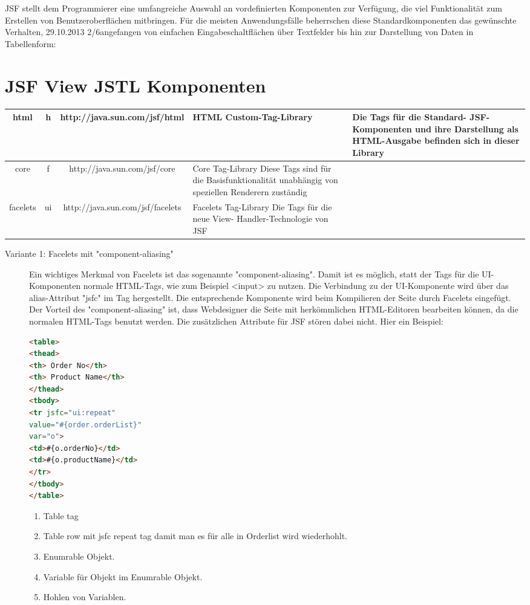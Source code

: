 \documentclass[a4paper,10pt]{scrreprt}
\begin{document}
{JSF stellt dem Programmierer eine umfangreiche Auswahl an vordefinierten Komponenten zur
Verfügung, die viel Funktionalität zum Erstellen von Benutzeroberflächen mitbringen. Für die
meisten Anwendungsfälle beherrschen diese Standardkomponenten das gewünschte Verhalten,
29.10.2013
2/6angefangen von einfachen Eingabeschaltflächen über Textfelder bis hin zur Darstellung von Daten
in Tabellenform:

\section{JSF View JSTL Komponenten}
\begin{tabular}{c | c | c | p{4cm}| p{4cm} | }
 html & h &  http://java.sun.com/jsf/html & HTML Custom-Tag-Library&Die Tags für die Standard- JSF-Komponenten und ihre
Darstellung als HTML-Ausgabe befinden sich in dieser Library \\ \hline
core & f & http://java.sun.com/jsf/core & Core Tag-Library Diese Tags sind für die Basisfunktionalität unabhängig 
von speziellen Renderern zuständig \\ \hline
facelets & ui & http://java.sun.com/jsf/facelets & Facelets Tag-Library
Die Tags für die neue View-
Handler-Technologie von JSF 
\\ \hline
\end{tabular}
\begin{description}
 \item [Variante 1: Facelets mit "component-aliasing"] Ein wichtiges Merkmal von Facelets ist das sogenannte 
"component-aliasing". Damit ist es möglich,
statt der Tags für die UI-Komponenten normale HTML-Tags, wie zum Beispiel <input> zu nutzen.
Die Verbindung zu der UI-Komponente wird über das alias-Attribut "jsfc" im Tag hergestellt. Die
entsprechende Komponente wird beim Kompilieren der Seite durch Facelets eingefügt. Der Vorteil
des "component-aliasing" ist, dass Webdesigner die Seite mit herkömmlichen HTML-Editoren
bearbeiten können, da die normalen HTML-Tags benutzt werden. Die zusätzlichen Attribute für JSF
stören dabei nicht. Hier ein Beispiel:
\begin{lstlisting}[caption=Component Aliasing,language=html]
 <table>
<thead>
<th> Order No</th>
<th> Product Name</th>
</thead>
<tbody>
<tr jsfc="ui:repeat"
value="#{order.orderList}"
var="o">
<td>#{o.orderNo}</td>
<td>#{o.productName}</td>
</tr>
</tbody>
</table>
\end{lstlisting}
\begin{enumerate}
 \item Table tag
 \item Table row mit jsfc repeat tag damit man es für alle in Orderlist wird wiederhohlt.
 \item Enumrable Objekt.
 \item Variable für Objekt im Enumrable Objekt.
 \item Hohlen von Variablen.
\end{enumerate}


\end{description}}
\end{document}
